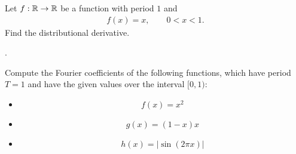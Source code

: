 \documentclass[11pt]{article}
\begin{document}
\begin{exercise}
    Let $f : \mathbb{R} \rightarrow \mathbb{R}$ be a function with period $1$ and 
    \begin{align*}
        f(x) = x, \qquad 0 < x < 1.
    \end{align*}
    Find the distributional derivative. 
\end{exercise}
\begin{solution}
    .
\end{solution}
\begin{exercise}
    Compute the Fourier coefficients of the following functions, which have period $T = 1$ and have the given values over the interval $[0,1)$:
    \begin{itemize}
     \item 
     \[
        f(x) = x^{2}
     \]
     \item 
     \[
        g(x) = (1-x)x
     \]
     \item 
     \[
        h(x) = |\sin( 2 \pi x )|
     \]
    \end{itemize}
\end{exercise}
\end{document}
